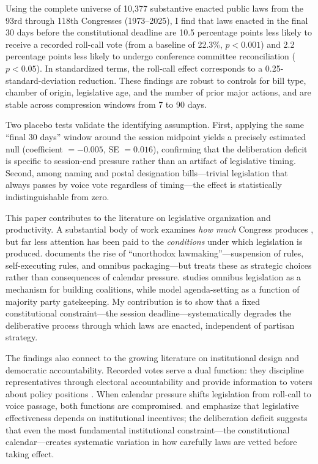 \documentclass[12pt]{article}
\begin{document}
Using the complete universe of 10,377 substantive enacted public laws from the 93rd through 118th Congresses (1973--2025), I find that laws enacted in the final 30 days before the constitutional deadline are 10.5 percentage points less likely to receive a recorded roll-call vote (from a baseline of 22.3\%, $p < 0.001$) and 2.2 percentage points less likely to undergo conference committee reconciliation ($p < 0.05$). In standardized terms, the roll-call effect corresponds to a 0.25-standard-deviation reduction. These findings are robust to controls for bill type, chamber of origin, legislative age, and the number of prior major actions, and are stable across compression windows from 7 to 90 days.

Two placebo tests validate the identifying assumption. First, applying the same ``final 30 days'' window around the session midpoint yields a precisely estimated null (coefficient $= -0.005$, SE $= 0.016$), confirming that the deliberation deficit is specific to session-end pressure rather than an artifact of legislative timing. Second, among naming and postal designation bills---trivial legislation that always passes by voice vote regardless of timing---the effect is statistically indistinguishable from zero.

This paper contributes to the literature on legislative organization and productivity. A substantial body of work examines \textit{how much} Congress produces \citep{Mayhew1991, Binder1999, Lapinski2008, Clinton2006}, but far less attention has been paid to the \textit{conditions} under which legislation is produced. \citet{Sinclair2012} documents the rise of ``unorthodox lawmaking''---suspension of rules, self-executing rules, and omnibus packaging---but treats these as strategic choices rather than consequences of calendar pressure. \citet{Krutz2001} studies omnibus legislation as a mechanism for building coalitions, while \citet{Cox2005} model agenda-setting as a function of majority party gatekeeping. My contribution is to show that a fixed constitutional constraint---the session deadline---systematically degrades the deliberative process through which laws are enacted, independent of partisan strategy.

The findings also connect to the growing literature on institutional design and democratic accountability. Recorded votes serve a dual function: they discipline representatives through electoral accountability \citep{Snyder2005} and provide information to voters about policy positions \citep{Clinton2004}. When calendar pressure shifts legislation from roll-call to voice passage, both functions are compromised. \citet{Lee2009} and \citet{Volden2014} emphasize that legislative effectiveness depends on institutional incentives; the deliberation deficit suggests that even the most fundamental institutional constraint---the constitutional calendar---creates systematic variation in how carefully laws are vetted before taking effect.
\end{document}
